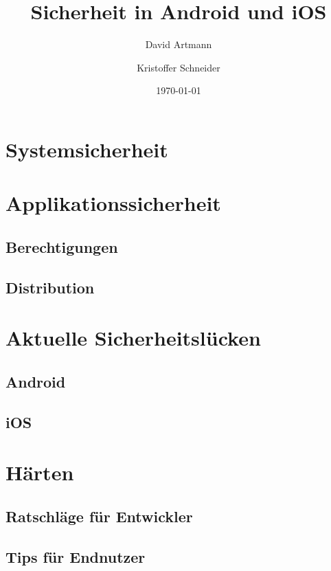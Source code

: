\documentclass[aspectratio=169]{beamer}
\title{Sicherheit in Android und iOS}
\author{David Artmann \and Kristoffer Schneider}
\institute[Universities of]
{
\inst{}
Hochschule für angewandte Wissenschaften\\
Würzburg-Schweinfurt
}
\date{\today}
\begin{document}



\section[Systemsicherheit]{Systemsicherheit}
	
\section[Applikationssicherheit]{Applikationssicherheit}
	\subsection{Berechtigungen}
		
		
	\subsection{Distribution}
		
\section[Aktuelle Sicherheitslücken]{Aktuelle Sicherheitslücken}
	\subsection{Android}
		
	\subsection{iOS}
		
\section{Härten}
	\subsection{Ratschläge für Entwickler}
		
	\subsection{Tips für Endnutzer}
		
\end{document}
